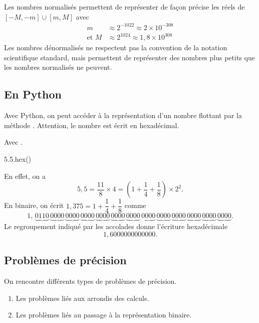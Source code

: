 Les nombres normalisés permettent de représenter de façon précise les
réels de
$[-M,-m]\cup [m, M]$ 
avec
\begin{align*}
  m &\approx2^{-1022}\approx 2\times 10^{-308}\\
\text{et }  M &\approx 2^{1024}\approx 1,8 \times 10^{308}
\end{align*}
Les nombres dénormalisés ne respectent pas la convention de la notation scientifique standard, mais permettent de représenter des nombres plus petits que les nombres normalisés ne peuvent. 



\subsection{En Python}

Avec Python, on peut accéder à la représentation d'un nombre flottant par la méthode . Attention, le nombre est écrit en hexadécimal. 

\begin{exemple}
  Avec . 
\begin{pyconsole}
5.5.hex()
\end{pyconsole}
En effet, on a 
\begin{equation*}
  5,5 = \dfrac{11}{8} \times 4 = \left(1 + \dfrac{1}{4} + \dfrac{1}{8} \right) \times 2^2.
\end{equation*}
En binaire, on écrit $1,375 = 1+\dfrac{1}{4} + \dfrac{1}{8}$ comme 
\begin{equation*}
  1,\,\underbrace{0110}\,\underbrace{0000}\,\underbrace{0000}\,\underbrace{0000}\,\underbrace{0000}\,\underbrace{0000}\,\underbrace{0000}\,\underbrace{0000}\,\underbrace{0000}\,\underbrace{0000}\,\underbrace{0000}\,\underbrace{0000}\,\underbrace{0000}.
\end{equation*}
Le regroupement indiqué par les accolades donne l'écriture hexadécimale 
\begin{equation*}
  1,6000000000000.
\end{equation*}
\end{exemple}


\subsection{Problèmes de précision}

On rencontre différents types de problèmes de précision.
\begin{enumerate}
\item Les problèmes liés aux arrondis des calculs.
\item Les problèmes liés au passage à la représentation binaire.
\end{enumerate}

